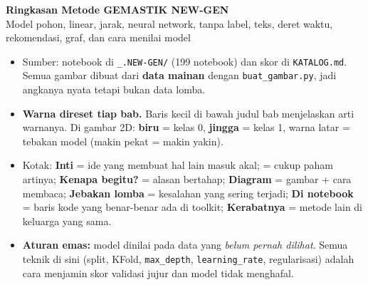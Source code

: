 \documentclass[10pt,a4paper]{article}
\newcommand{\kode}[1]{\texttt{\small #1}}
\begin{document}
\begin{center}
{\LARGE\bfseries Ringkasan Metode GEMASTIK NEW-GEN}\\[3pt]
{\normalsize Model pohon, linear, jarak, neural network, tanpa label, teks, deret waktu, rekomendasi, graf, dan cara menilai model}\\[4pt]
\end{center}

\begin{tcolorbox}[enhanced,colback=black!2,colframe=black!30,boxrule=0.4pt,arc=1pt,fontupper=\small,
  title={Cara memakai ringkasan ini},colbacktitle=black!7,coltitle=black,fonttitle=\bfseries\small]
\begin{itemize}
\item Sumber: notebook di \kode{\_.NEW-GEN/} (199 notebook) dan skor di \kode{KATALOG.md}. Semua gambar dibuat dari
\textbf{data mainan} dengan \kode{buat\_gambar.py}, jadi angkanya nyata tetapi bukan data lomba.
\item \textbf{Warna direset tiap bab.} Baris kecil di bawah judul bab menjelaskan arti warnanya. Di gambar 2D:
\textcolor{biru2}{\textbf{biru}} = kelas 0, \textcolor{merah3}{\textbf{jingga}} = kelas 1, warna latar = tebakan model
(makin pekat = makin yakin).
\item Kotak: \textcolor{biru1}{\textbf{Inti}} = ide yang membuat hal lain masuk akal;  = cukup paham artinya;
\textbf{Kenapa begitu?} = alasan bertahap; \textcolor{biru3!70!black}{\textbf{Diagram}} = gambar + cara membaca;
\textcolor{merah1}{\textbf{Jebakan lomba}} = kesalahan yang sering terjadi; \textbf{Di notebook} = baris kode yang
benar-benar ada di toolkit; \textbf{Kerabatnya} = metode lain di keluarga yang sama.
\item \textbf{Aturan emas:} model dinilai pada data yang \emph{belum pernah dilihat}. Semua teknik di sini (split, KFold,
\kode{max\_depth}, \kode{learning\_rate}, regularisasi) adalah cara menjamin skor validasi jujur dan model tidak menghafal.
\end{itemize}
\end{tcolorbox}
{\small\tableofcontents}
\end{document}
